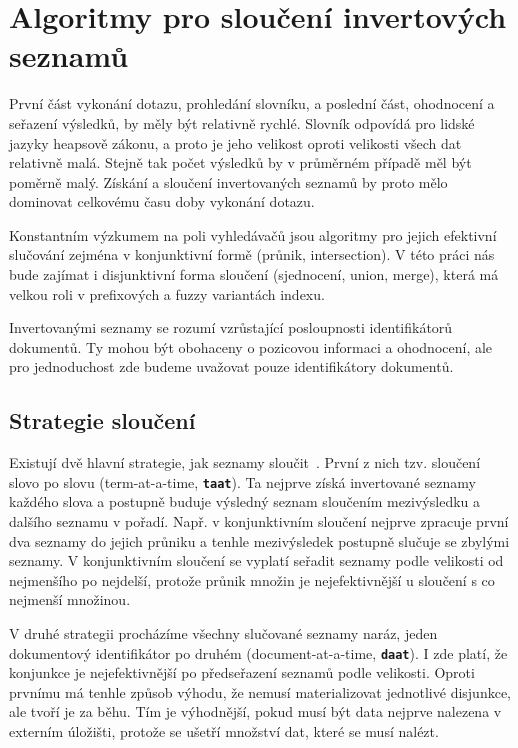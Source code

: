\documentclass[11pt,letterpaper,oneside,openright]{book}
\newcommand{\bftt}[1]{\texttt{\textbf{#1}}}
\begin{document}
\section{Algoritmy pro sloučení invertových seznamů}
První část vykonání dotazu, prohledání slovníku, a poslední část, ohodnocení a
seřazení výsledků, by měly být relativně rychlé. Slovník odpovídá pro lidské
jazyky heapsově zákonu, a proto je jeho velikost oproti velikosti všech dat
relativně malá.  Stejně tak počet výsledků by v průměrném případě měl být
poměrně malý. Získání a sloučení invertovaných seznamů by proto mělo dominovat
celkovému času doby vykonání dotazu.

Konstantním výzkumem na poli vyhledávačů jsou algoritmy pro jejich efektivní
slučování zejména v konjunktivní formě (průnik, intersection). V této práci nás
bude zajímat i disjunktivní forma sloučení (sjednocení, union, merge), která má
velkou roli v prefixových a fuzzy variantách indexu.

Invertovanými seznamy se rozumí vzrůstající posloupnosti identifikátorů
dokumentů. Ty mohou být obohaceny o pozicovou informaci a ohodnocení, ale pro
jednoduchost zde budeme uvažovat pouze identifikátory dokumentů.

\subsection{Strategie sloučení}
Existují dvě hlavní strategie, jak seznamy
sloučit~\cite{Lacour_efficiencycomparison}. První z nich tzv. sloučení slovo po
slovu (term-at-a-time, \bftt{taat}). Ta nejprve získá invertované seznamy
každého slova a postupně buduje výsledný seznam sloučením mezivýsledku a
dalšího seznamu v pořadí. Např. v konjunktivním sloučení nejprve zpracuje první
dva seznamy do jejich průniku a tenhle mezivýsledek postupně slučuje se zbylými
seznamy. V konjunktivním sloučení se vyplatí seřadit seznamy podle velikosti od
nejmenšího po nejdelší, protože průnik množin je nejefektivnější u sloučení s
co nejmenší množinou.

V druhé strategii procházíme všechny slučované seznamy naráz, jeden dokumentový
identifikátor po druhém (document-at-a-time, \bftt{daat}). I zde platí, že
konjunkce je nejefektivnější po předseřazení seznamů podle velikosti. Oproti
prvnímu má tenhle způsob výhodu, že nemusí materializovat jednotlivé disjunkce,
ale tvoří je za běhu. Tím je výhodnější, pokud musí být data nejprve nalezena v
externím úložišti, protože se ušetří množství dat, které se musí nalézt.
\end{document}
